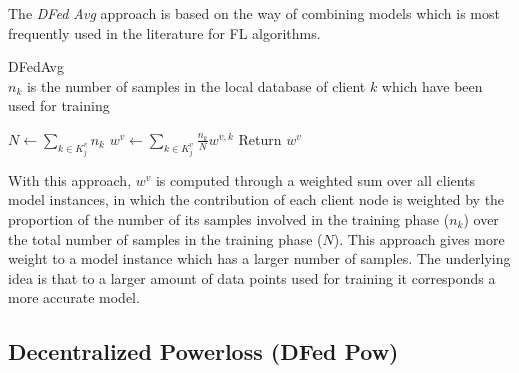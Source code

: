 \documentclass[conference]{IEEEtran}
\begin{document}
The \textit{DFed Avg} approach is based on the way of combining models which is most frequently used in the literature for FL algorithms.%
%
\label{sec:DFedAvg}
\begin{algorithm}[!htb]
\small
\caption{DFedAvg\\
$n_k$ is the number of samples in the local database of client $k$ which have been used for training}
\begin{algorithmic}
\label{mergFedAvg}
\State $N \gets \sum\limits_{k\in K^{v}_j}n_k$
\State $ w^{v} \gets  \sum\limits_{k\in K^{v}_j} \frac{n_k}{N}  w^{v,k} $
\State Return $w^{v}$
\EndFunction
\end{algorithmic}
\normalsize
\end{algorithm}
With this approach, $w^{v}$ is computed through a weighted sum over all clients model instances, in which the contribution of each client node is weighted by the proportion of the number of its samples involved in the training phase ($n_k$) over the total number of samples in the training phase ($N$). This approach gives more weight to a model instance which has a larger number of samples. The underlying idea is that to a larger amount of data points used for training it corresponds a more accurate model. %
\vspace{-0.1in}
\subsection{Decentralized  Powerloss (DFed Pow)} 
\end{document}
